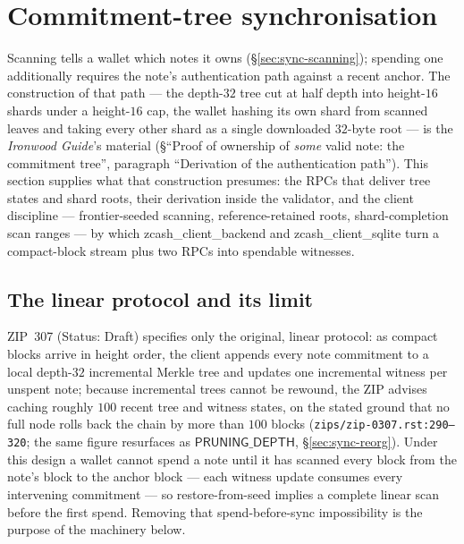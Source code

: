 \documentclass[11pt,a4paper]{article}
\theoremstyle{definition}
\begin{document}
\section{Commitment-tree synchronisation}\label{sec:sync-tree}

Scanning tells a wallet which notes it owns (\S\ref{sec:sync-scanning});
spending one additionally requires the note's authentication path against
a recent anchor. The construction of that path --- the depth-$32$ tree cut
at half depth into height-$16$ shards under a height-$16$ cap, the wallet
hashing its own shard from scanned leaves and taking every other shard as
a single downloaded $32$-byte root --- is the \emph{Ironwood Guide}'s
material (\S``Proof of ownership of \emph{some} valid note: the
commitment tree'', paragraph ``Derivation of the authentication path'').
This section supplies what that construction presumes: the RPCs that
deliver tree states and shard roots, their derivation inside the
validator, and the client discipline --- frontier-seeded scanning,
reference-retained roots, shard-completion scan ranges --- by which
\textsf{zcash\_client\_backend} and \textsf{zcash\_client\_sqlite} turn a
compact-block stream plus two RPCs into spendable witnesses.

\subsection{The linear protocol and its limit}\label{sec:sync-tree-linear}

ZIP~307 (Status: Draft) specifies only the original, linear protocol: as
compact blocks arrive in height order, the client appends every note
commitment to a local depth-$32$ incremental Merkle tree and updates one
incremental witness per unspent note; because incremental trees cannot be
rewound, the ZIP advises caching roughly $100$ recent tree and witness
states, on the stated ground that no full node rolls back the chain by
more than $100$ blocks (\texttt{zips/zip-0307.rst:290--320}; the same
figure resurfaces as $\mathsf{PRUNING\_DEPTH}$, \S\ref{sec:sync-reorg}).
Under this design a wallet cannot spend a note until it has scanned every
block from the note's block to the anchor block --- each witness update
consumes every intervening commitment --- so restore-from-seed implies a
complete linear scan before the first spend. Removing that
spend-before-sync impossibility is the purpose of the machinery below.
\end{document}
